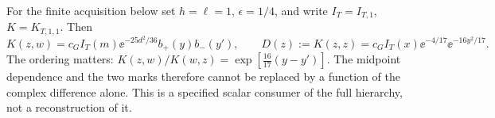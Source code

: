 For the finite acquisition below set $h=\ell=1$, $\epsilon=1/4$,
and write $I_T=I_{T,1}$, $K=K_{T,1,1}$. Then
\begin{equation}\label{eq:projection-kernel}
 K(z,w)=c_G I_T(m)\ee^{-25d^2/36}b_+(y)b_-(y'),\qquad
 D(z):=K(z,z)=c_G I_T(x)\ee^{-4/17}\ee^{-16y^2/17}.
\end{equation}
The ordering matters:
$K(z,w)/K(w,z)=\exp[\frac{16}{17}(y-y')]$.
The midpoint dependence and the two marks therefore cannot be replaced
by a function of the complex difference alone. This is a specified
scalar consumer of the full hierarchy, not a reconstruction of it.
